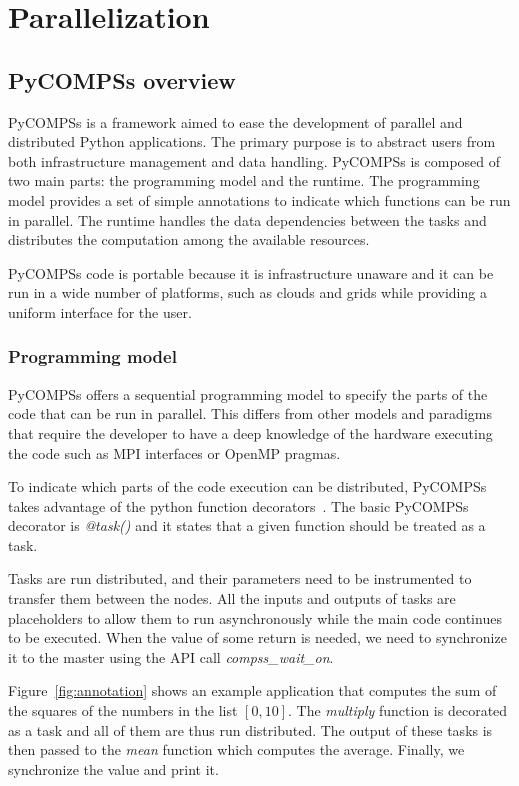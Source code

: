 \chapter{Parallelization}
\label{chap:parallelization}

\section{PyCOMPSs overview}

PyCOMPSs \cite{pycompss} is a framework aimed to ease the development of parallel and distributed Python applications. The primary purpose is to abstract users from both infrastructure management and data handling. PyCOMPSs is composed of two main parts: the programming model and the runtime. The programming model provides a set of simple annotations to indicate which functions can be run in parallel. The runtime handles the data dependencies between the tasks and distributes the computation among the available resources.

PyCOMPSs code is portable because it is infrastructure unaware and it can be run in a wide number of platforms, such as clouds and grids while providing a uniform interface for the user. 

\subsection{Programming model}
PyCOMPSs offers a sequential programming model to specify the parts of the code that can be run in parallel. This differs from other models and paradigms that require the developer to have a deep knowledge of the hardware executing the code such as MPI interfaces or OpenMP pragmas. 

To indicate which parts of the code execution can be distributed, PyCOMPSs takes advantage of the python function decorators~\cite{decorators}. The basic PyCOMPSs decorator is \textit{@task()} and it states that a given function should be treated as a task. 

Tasks are run distributed, and their parameters need to be instrumented to transfer them between the nodes. All the inputs and outputs of tasks are placeholders to allow them to run asynchronously while the main code continues to be executed. When the value of some return is needed, we need to synchronize it to the master using the API call \textit{compss\_wait\_on}. 

Figure~\ref{fig:annotation} shows an example application that computes the sum of the squares of the numbers in the list $[0, 10]$. The \textit{multiply} function is decorated as a task and all of them are thus run distributed. The output of these tasks is then passed to the \textit{mean} function which computes the average. Finally, we synchronize the value and print it.


